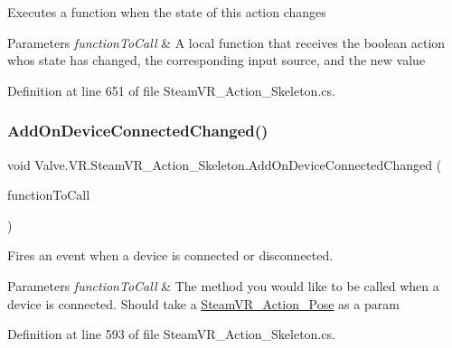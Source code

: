 Executes a function when the state of this action changes 


\begin{DoxyParams}{Parameters}
{\em function\+To\+Call} & A local function that receives the boolean action who\textquotesingle{}s state has changed, the corresponding input source, and the new value\\
\hline
\end{DoxyParams}


Definition at line 651 of file Steam\+V\+R\+\_\+\+Action\+\_\+\+Skeleton.\+cs.

\mbox{\label{class_valve_1_1_v_r_1_1_steam_v_r___action___skeleton_ab0eb571e713112bf6695f2a322980522}} 
\subsubsection{\texorpdfstring{AddOnDeviceConnectedChanged()}{AddOnDeviceConnectedChanged()}}
{\footnotesize\ttfamily void Valve.\+V\+R.\+Steam\+V\+R\+\_\+\+Action\+\_\+\+Skeleton.\+Add\+On\+Device\+Connected\+Changed (\begin{DoxyParamCaption}\item[{\mbox{\hyperlink{class_valve_1_1_v_r_1_1_steam_v_r___action___skeleton_a737d68e8f67790bf838b4f5bac3ffae1}{Device\+Connected\+Change\+Handler}}}]{function\+To\+Call }\end{DoxyParamCaption})}



Fires an event when a device is connected or disconnected. 


\begin{DoxyParams}{Parameters}
{\em function\+To\+Call} & The method you would like to be called when a device is connected. Should take a \mbox{\hyperlink{class_valve_1_1_v_r_1_1_steam_v_r___action___pose}{Steam\+V\+R\+\_\+\+Action\+\_\+\+Pose}} as a param\\
\hline
\end{DoxyParams}


Definition at line 593 of file Steam\+V\+R\+\_\+\+Action\+\_\+\+Skeleton.\+cs.

\mbox{\label{class_valve_1_1_v_r_1_1_steam_v_r___action___skeleton_af5921e5234ffab73345554d65c335f2f}} 
